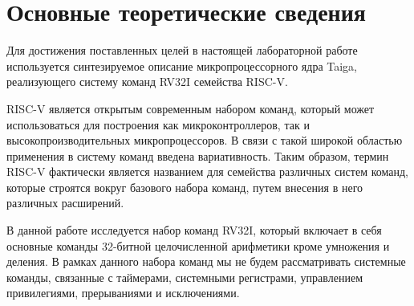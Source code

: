 \chapter{Основные теоретические сведения}

Для достижения поставленных целей в настоящей лабораторной работе используется
синтезируемое описание микропроцессорного ядра Taiga, реализующего систему
команд RV32I семейства RISC-V.

RISC-V является открытым современным набором команд, который может
использоваться для построения как микроконтроллеров, так и
высокопроизводительных микропроцессоров.  В связи с такой широкой областью
применения в систему команд введена вариативность.  Таким образом, термин
RISC-V фактически является названием для семейства различных систем команд,
которые строятся вокруг базового набора команд, путем внесения в него различных
расширений.


В данной работе исследуется набор команд RV32I, который включает в себя
основные команды 32-битной целочисленной арифметики кроме умножения и деления.
В рамках данного набора команд мы не будем рассматривать системные команды,
связанные с таймерами, системными регистрами, управлением привилегиями,
прерываниями и исключениями.
